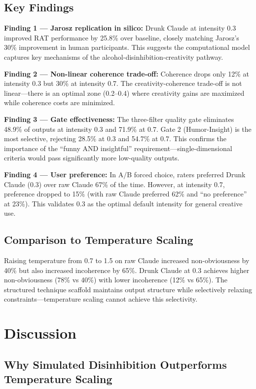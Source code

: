 \documentclass[11pt,a4paper]{article}
\begin{document}
\subsection{Key Findings}

\textbf{Finding 1 — Jarosz replication in silico:} Drunk Claude at intensity 0.3 improved RAT performance by 25.8\% over baseline, closely matching Jarosz's 30\% improvement in human participants. This suggests the computational model captures key mechanisms of the alcohol-disinhibition-creativity pathway.

\textbf{Finding 2 — Non-linear coherence trade-off:} Coherence drops only 12\% at intensity 0.3 but 30\% at intensity 0.7. The creativity-coherence trade-off is not linear---there is an optimal zone (0.2--0.4) where creativity gains are maximized while coherence costs are minimized.

\textbf{Finding 3 — Gate effectiveness:} The three-filter quality gate eliminates 48.9\% of outputs at intensity 0.3 and 71.9\% at 0.7. Gate 2 (Humor-Insight) is the most selective, rejecting 28.5\% at 0.3 and 54.7\% at 0.7. This confirms the importance of the ``funny AND insightful'' requirement---single-dimensional criteria would pass significantly more low-quality outputs.

\textbf{Finding 4 — User preference:} In A/B forced choice, raters preferred Drunk Claude (0.3) over raw Claude 67\% of the time. However, at intensity 0.7, preference dropped to 15\% (with raw Claude preferred 62\% and ``no preference'' at 23\%). This validates 0.3 as the optimal default intensity for general creative use.

\subsection{Comparison to Temperature Scaling}

Raising temperature from 0.7 to 1.5 on raw Claude increased non-obviousness by 40\% but also increased incoherence by 65\%. Drunk Claude at 0.3 achieves higher non-obviousness (78\% vs 40\%) with lower incoherence (12\% vs 65\%). The structured technique scaffold maintains output structure while selectively relaxing constraints---temperature scaling cannot achieve this selectivity.

\section{Discussion}

\subsection{Why Simulated Disinhibition Outperforms Temperature Scaling}
\end{document}
